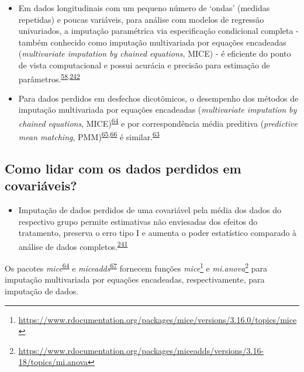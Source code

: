 \documentclass[
  a4paper,
]{book}
\providecommand{\tightlist}{%
  \setlength{\itemsep}{0pt}\setlength{\parskip}{0pt}}
\renewcommand{\href}[2]{#2\footnote{\url{#1}}}
\newenvironment{infobox}[1]
  {
  \begin{itemize}
  \renewcommand{\labelitemi}{
    \raisebox{-.7\height}[0pt][0pt]{
      {\setkeys{Gin}{width=3em,keepaspectratio}
        \texttt{[image: \#1]}}
    }
  }
  \setlength{\fboxsep}{1em}
  \begin{blackbox}
  \item
  }
  {
  \end{blackbox}
  \end{itemize}
  }
\begin{document}
\begin{itemize}
\item
  Em dados longitudinais com um pequeno número de `ondas' (medidas repetidas) e poucas variáveis, para análise com modelos de regressão univariados, a imputação paramétrica via especificação condicional completa - também conhecido como imputação multivariada por equações encadeadas (\emph{multivariate imputation by chained equations}, MICE) - é eficiente do ponto de vista computacional e possui acurácia e precisão para estimação de parâmetros.\textsuperscript{\protect\hyperlink{ref-Heymans2022}{58},\protect\hyperlink{ref-Cao2022}{242}}
\item
  Para dados perdidos em desfechos dicotômicos, o desempenho dos métodos de imputação multivariada por equações encadeadas (\emph{multivariate imputation by chained equations}, MICE)\textsuperscript{\protect\hyperlink{ref-mice}{64}} e por correspondência média preditiva (\emph{predictive mean matching}, PMM)\textsuperscript{\protect\hyperlink{ref-rubin1986}{65},\protect\hyperlink{ref-little1988a}{66}} é similar.\textsuperscript{\protect\hyperlink{ref-austin2023}{63}}
\end{itemize}

\hypertarget{como-lidar-com-os-dados-perdidos-em-covariuxe1veis}{%
\subsection{Como lidar com os dados perdidos em covariáveis?}\label{como-lidar-com-os-dados-perdidos-em-covariuxe1veis}}

\begin{itemize}
\tightlist
\item
  Imputação de dados perdidos de uma covariável pela média dos dados do respectivo grupo permite estimativas não enviesadas dos efeitos do tratamento, preserva o erro tipo I e aumenta o poder estatístico comparado à análise de dados completos.\textsuperscript{\protect\hyperlink{ref-Kahan2014}{241}}
\end{itemize}

\begin{infobox}{images/Rlogo}
Os pacotes \emph{mice}\textsuperscript{\protect\hyperlink{ref-mice}{64}} e \emph{miceadds}\textsuperscript{\protect\hyperlink{ref-miceadds}{67}} fornecem funções \href{https://www.rdocumentation.org/packages/mice/versions/3.16.0/topics/mice}{\emph{mice}} e \href{https://www.rdocumentation.org/packages/miceadds/versions/3.16-18/topics/mi.anova}{\emph{mi.anova}} para imputação multivariada por equações encadeadas, respectivamente, para imputação de dados.

\end{infobox}
\end{document}
